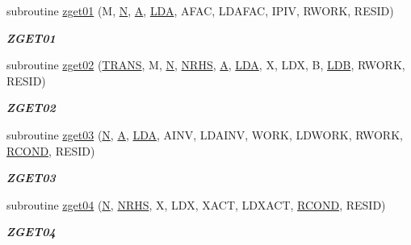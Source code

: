 \begin{DoxyCompactItemize}
subroutine \hyperlink{group__complex16__lin_gaa76ec0bd191997d687577c30f2cc6133}{zget01} (M, \hyperlink{polmisc_8c_a0240ac851181b84ac374872dc5434ee4}{N}, \hyperlink{classA}{A}, \hyperlink{example__user_8c_ae946da542ce0db94dced19b2ecefd1aa}{L\+D\+A}, A\+F\+A\+C, L\+D\+A\+F\+A\+C, I\+P\+I\+V, R\+W\+O\+R\+K, R\+E\+S\+I\+D)
\begin{DoxyCompactList}\small\item\em {\bfseries Z\+G\+E\+T01} \end{DoxyCompactList}\item 
subroutine \hyperlink{group__complex16__lin_ga66d124fa093cbd4a9c70d869fae241fd}{zget02} (\hyperlink{superlu__enum__consts_8h_a0c4e17b2d5cea33f9991ccc6a6678d62a1f61e3015bfe0f0c2c3fda4c5a0cdf58}{T\+R\+A\+N\+S}, M, \hyperlink{polmisc_8c_a0240ac851181b84ac374872dc5434ee4}{N}, \hyperlink{example__user_8c_aa0138da002ce2a90360df2f521eb3198}{N\+R\+H\+S}, \hyperlink{classA}{A}, \hyperlink{example__user_8c_ae946da542ce0db94dced19b2ecefd1aa}{L\+D\+A}, X, L\+D\+X, B, \hyperlink{example__user_8c_a50e90a7104df172b5a89a06c47fcca04}{L\+D\+B}, R\+W\+O\+R\+K, R\+E\+S\+I\+D)
\begin{DoxyCompactList}\small\item\em {\bfseries Z\+G\+E\+T02} \end{DoxyCompactList}\item 
subroutine \hyperlink{group__complex16__lin_gaff3bb034127c1c9d6ca4ba98582720ef}{zget03} (\hyperlink{polmisc_8c_a0240ac851181b84ac374872dc5434ee4}{N}, \hyperlink{classA}{A}, \hyperlink{example__user_8c_ae946da542ce0db94dced19b2ecefd1aa}{L\+D\+A}, A\+I\+N\+V, L\+D\+A\+I\+N\+V, W\+O\+R\+K, L\+D\+W\+O\+R\+K, R\+W\+O\+R\+K, \hyperlink{superlu__enum__consts_8h_af00a42ecad444bbda75cde1b64bd7e72a9b5c151728d8512307565994c89919d5}{R\+C\+O\+N\+D}, R\+E\+S\+I\+D)
\begin{DoxyCompactList}\small\item\em {\bfseries Z\+G\+E\+T03} \end{DoxyCompactList}\item 
subroutine \hyperlink{group__complex16__lin_ga540d078adc1358e618132670f1bee892}{zget04} (\hyperlink{polmisc_8c_a0240ac851181b84ac374872dc5434ee4}{N}, \hyperlink{example__user_8c_aa0138da002ce2a90360df2f521eb3198}{N\+R\+H\+S}, X, L\+D\+X, X\+A\+C\+T, L\+D\+X\+A\+C\+T, \hyperlink{superlu__enum__consts_8h_af00a42ecad444bbda75cde1b64bd7e72a9b5c151728d8512307565994c89919d5}{R\+C\+O\+N\+D}, R\+E\+S\+I\+D)
\begin{DoxyCompactList}\small\item\em {\bfseries Z\+G\+E\+T04} \end{DoxyCompactList}\item 

\end{DoxyCompactItemize}
